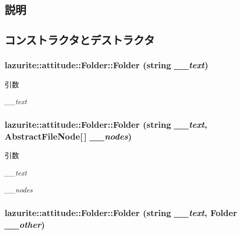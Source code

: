 \subsection{説明}


\subsection{コンストラクタとデストラクタ}
\hypertarget{classlazurite_1_1attitude_1_1_folder_a2f719c608e0aa3b6d36c40d31b167e79}{
\subsubsection[{Folder}]{\setlength{\rightskip}{0pt plus 5cm}lazurite::attitude::Folder::Folder (string {\em \_\-\_\-text})}}
\label{classlazurite_1_1attitude_1_1_folder_a2f719c608e0aa3b6d36c40d31b167e79}

\begin{DoxyParams}{引数}
\item[{\em \_\-\_\-text}]\end{DoxyParams}
\hypertarget{classlazurite_1_1attitude_1_1_folder_a5a7781a599e70e8c137cede1357b5ea1}{
\subsubsection[{Folder}]{\setlength{\rightskip}{0pt plus 5cm}lazurite::attitude::Folder::Folder (string {\em \_\-\_\-text}, \/  {\bf AbstractFileNode}\mbox{[}$\,$\mbox{]} {\em \_\-\_\-nodes})}}
\label{classlazurite_1_1attitude_1_1_folder_a5a7781a599e70e8c137cede1357b5ea1}

\begin{DoxyParams}{引数}
\item[{\em \_\-\_\-text}]\item[{\em \_\-\_\-nodes}]\end{DoxyParams}
\hypertarget{classlazurite_1_1attitude_1_1_folder_a06d32f03805baad6c1801dcb1985dea4}{
\subsubsection[{Folder}]{\setlength{\rightskip}{0pt plus 5cm}lazurite::attitude::Folder::Folder (string {\em \_\-\_\-text}, \/  {\bf Folder} {\em \_\-\_\-other})}}
\label{classlazurite_1_1attitude_1_1_folder_a06d32f03805baad6c1801dcb1985dea4}

